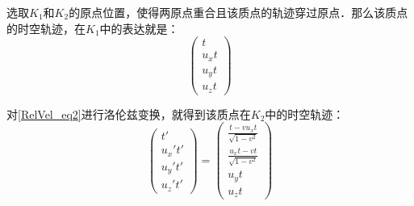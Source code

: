 选取$K_1$和$K_2$的原点位置，使得两原点重合且该质点的轨迹穿过原点．那么该质点的时空轨迹，在$K_1$中的表达就是：
\begin{equation}\label{RelVel_eq2}
\left(\begin{matrix}t\\u_xt\\u_yt\\u_zt\end{matrix} \right) 
\end{equation}

对\autoref{RelVel_eq2}进行洛伦兹变换，就得到该质点在$K_2$中的时空轨迹：
\begin{equation}
\left(\begin{matrix}t'\\u_x't'\\u_y't'\\u_z't'\end{matrix} \right) 
= 
\left(\begin{matrix}\frac{t-vu_xt}{\sqrt{1-v^2}}\\\frac{u_xt-vt}{\sqrt{1-v^2}}\\u_yt\\u_zt\end{matrix} \right) 
\end{equation}







